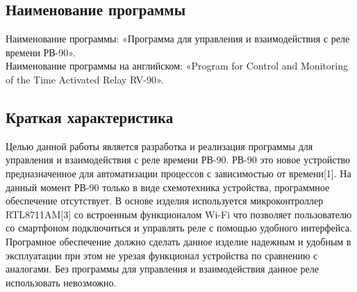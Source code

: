 \subsection{Наименование программы}
Наименование программы: «Программа для управления и взаимодействия с реле времени РВ-90». \\
Наименование программы на английском: «Program for Control and Monitoring of the Time Activated Relay RV-90». \\


\subsection{Краткая характеристика}
Целью данной работы является разработка и реализация программы для управления и взаимодействия с реле времени РВ-90. РВ-90 это новое устройство предназначенное для автоматизации процессов с зависимостью от времени[1]. На данный момент РВ-90 только в виде схемотехника устройства, программное обеспечение отсутствует. В основе изделия используется микроконтроллер RTL8711AM[3] со встроенным функционалом Wi-Fi что позволяет пользователю со смартфоном подключиться и управлять реле с помощью удобного интерфейса. Програмное обеспечение должно сделать данное изделие надежным и удобным в эксплуатации при этом не урезая функционал устройства по сравнению с аналогами. Без программы для управления и взаимодействия данное реле использовать невозможно.